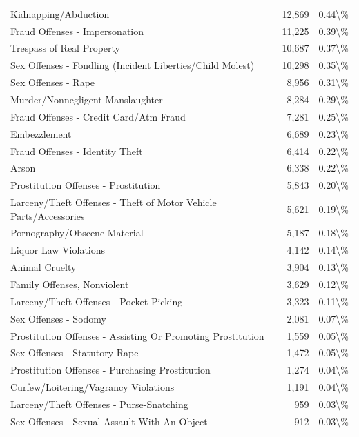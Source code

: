 \documentclass[
  12pt,
  openany]{book}
\begin{document}
\begin{longtable}[t]{lrr}
\addlinespace
Kidnapping/Abduction & 12,869 & 0.44\textbackslash{}\%\\
Fraud Offenses - Impersonation & 11,225 & 0.39\textbackslash{}\%\\
Trespass of Real Property & 10,687 & 0.37\textbackslash{}\%\\
Sex Offenses - Fondling (Incident Liberties/Child Molest) & 10,298 & 0.35\textbackslash{}\%\\
Sex Offenses - Rape & 8,956 & 0.31\textbackslash{}\%\\
\addlinespace
Murder/Nonnegligent Manslaughter & 8,284 & 0.29\textbackslash{}\%\\
Fraud Offenses - Credit Card/Atm Fraud & 7,281 & 0.25\textbackslash{}\%\\
Embezzlement & 6,689 & 0.23\textbackslash{}\%\\
Fraud Offenses - Identity Theft & 6,414 & 0.22\textbackslash{}\%\\
Arson & 6,338 & 0.22\textbackslash{}\%\\
\addlinespace
Prostitution Offenses - Prostitution & 5,843 & 0.20\textbackslash{}\%\\
Larceny/Theft Offenses - Theft of Motor Vehicle Parts/Accessories & 5,621 & 0.19\textbackslash{}\%\\
Pornography/Obscene Material & 5,187 & 0.18\textbackslash{}\%\\
Liquor Law Violations & 4,142 & 0.14\textbackslash{}\%\\
Animal Cruelty & 3,904 & 0.13\textbackslash{}\%\\
\addlinespace
Family Offenses, Nonviolent & 3,629 & 0.12\textbackslash{}\%\\
Larceny/Theft Offenses - Pocket-Picking & 3,323 & 0.11\textbackslash{}\%\\
Sex Offenses - Sodomy & 2,081 & 0.07\textbackslash{}\%\\
Prostitution Offenses - Assisting Or Promoting Prostitution & 1,559 & 0.05\textbackslash{}\%\\
Sex Offenses - Statutory Rape & 1,472 & 0.05\textbackslash{}\%\\
\addlinespace
Prostitution Offenses - Purchasing Prostitution & 1,274 & 0.04\textbackslash{}\%\\
Curfew/Loitering/Vagrancy Violations & 1,191 & 0.04\textbackslash{}\%\\
Larceny/Theft Offenses - Purse-Snatching & 959 & 0.03\textbackslash{}\%\\
Sex Offenses - Sexual Assault With An Object & 912 & 0.03\textbackslash{}\%\\

\end{longtable}
\end{document}
